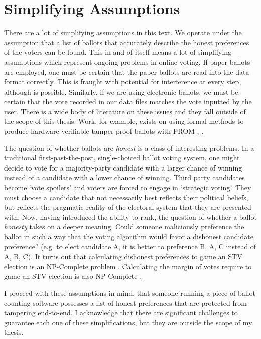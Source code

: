 \section{Simplifying Assumptions}

There are a lot of simplifying assumptions in this text. We operate under the
assumption that a list of ballots that accurately describe the honest
preferences of the voters can be found. This in-and-of-itself means a lot of
simplifying assumptions which represent ongoing problems in online voting. If
paper ballots are employed, one must be certain that the paper ballots are read
into the data format correctly. This is fraught with potential for interference
at every step, although is possible. Similarly, if we are using electronic
ballots, we must be certain that the vote recorded in our data files matches the
vote inputted by the user. There is a wide body of literature on these issues
and they fall outside of the scope of this thesis. Work, for example, exists on
using formal methods to produce hardware-verifiable tamper-proof ballots with
PROM \cite{prom1}, \cite{prom2}. 

The question of whether ballots are \textit{honest} is a class of interesting
problems. In a traditional first-past-the-post, single-choiced ballot voting
system, one might decide to vote for a majority-party candidate with a larger
chance of winning instead of a candidate with a lower chance of winning. Third
party candidates become `vote spoilers' and voters are forced to engage in
`strategic voting'. They must choose a candidate that not necessarily best
reflects their political beliefs, but reflects the pragmatic reality of the
electoral system that they are presented with. Now, having introduced the
ability to rank, the question of whether a ballot \textit{honesty} takes on a
deeper meaning. Could someone maliciously preference the ballot in such a way
that the voting algorithm would favor a dishonest candidate preference? (e.g. to
elect candidate A, it is better to preference B, A, C instead of A, B, C). It
turns out that calculating dishonest preferences to game an STV election is an
NP-Complete problem \cite{strategic}. Calculating the margin of votes require to
game an STV election is also NP-Complete \cite{margin_of_victory}. 

I proceed with these assumptions in mind, that someone running a piece of ballot
counting software possesses a list of honest preferences that are protected from
tampering end-to-end. I acknowledge that there are significant challenges to
guarantee each one of these simplifications, but they are outside the scope of
my thesis. 
